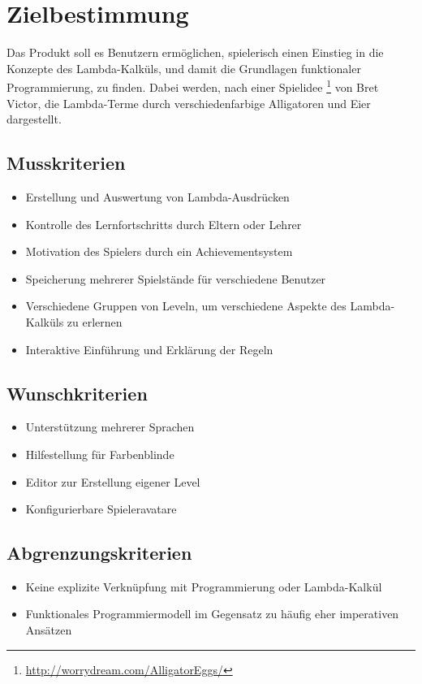 \section{Zielbestimmung}
Das Produkt soll es Benutzern ermöglichen, spielerisch einen Einstieg in die Konzepte des Lambda-Kalküls, und damit die Grundlagen funktionaler Programmierung, zu finden.
Dabei werden, nach einer Spielidee \footnote{\url{http://worrydream.com/AlligatorEggs/}} von Bret Victor, die Lambda-Terme durch verschiedenfarbige Alligatoren und Eier dargestellt.


\subsection{Musskriterien}

\begin{itemize}
\item Erstellung und Auswertung von Lambda-Ausdrücken
\item Kontrolle des Lernfortschritts durch Eltern oder Lehrer
\item Motivation des Spielers durch ein Achievementsystem
\item Speicherung mehrerer Spielstände für verschiedene Benutzer
\item Verschiedene Gruppen von Leveln, um verschiedene Aspekte des Lambda-Kalküls zu erlernen
\item Interaktive Einführung und Erklärung der Regeln
\end{itemize}


\subsection{Wunschkriterien}

\begin{itemize}
\item Unterstützung mehrerer Sprachen
\item Hilfestellung für Farbenblinde
\item Editor zur Erstellung eigener Level
\item Konfigurierbare Spieleravatare
\end{itemize}


\subsection{Abgrenzungskriterien}

\begin{itemize}
	\item Keine explizite Verknüpfung mit Programmierung oder Lambda-Kalkül
	\item Funktionales Programmiermodell im Gegensatz zu häufig eher imperativen Ansätzen
\end{itemize}
